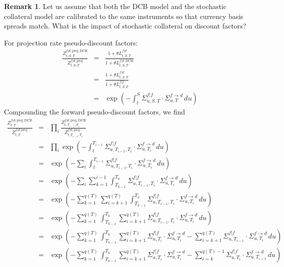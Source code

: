 \documentclass[11pt,english]{amsart}
\newcommand{\DCB}{\mathrm{DCB}}
\theoremstyle{definition}
\newtheorem{rema}{Remark}
\begin{document}
\begin{rema}
Let us assume that both the DCB model and the stochastic collateral model are calibrated to the same instruments so that currency basis spreads match. What is the impact of stochastic collateral on discount factors? 

For projection rate pseudo-discount factors:
\begin{eqnarray*}
  \frac{Z^{f|d,\mathrm{proj},\DCB}_{t,S,T}}{Z^{f|d,\mathrm{proj}}_{t,S,T}} 
  &=& \frac{1+\theta L^{f|d}_{t,S,T}}{1+\theta L^{f|d,\DCB}_{t,S,T}} \\
  &=& \frac{1+\theta L^{f|d}_{t,S,T}}{1+\theta L^{f|f}_{t,S,T}} \\
  &=& \exp\left( -\int_t^S \Sigma^{f|f}_{u,S,T} \cdot \Sigma^{f\to d}_{u,T}\, du \right) 
\end{eqnarray*} 
Compounding the forward pseudo-discount factors, we find
\begin{eqnarray*}
  \frac{Z^{f|d,\mathrm{proj},\DCB}_{t,T}}{Z^{f|d,\mathrm{proj}}_{t,T}} 
  &=& \prod_i \frac{Z^{f|d,\mathrm{proj},\DCB}_{t,T_{i-1},T_i}}{Z^{f|d,\mathrm{proj}}_{t,T_{i-1},T_i}}  \\
  &=& \prod_i  \exp\left( -\int_t^{T_{i-1}} \Sigma^{f|f}_{u,T_{i-1},T_i} \cdot \Sigma^{f\to d}_{u,T_i}\, du \right)   \\
  &=&  \exp\left( - \sum_i \int_t^{T_{i-1}} \Sigma^{f|f}_{u,T_{i-1},T_i} \cdot \Sigma^{f\to d}_{u,T_i}\, du \right)   \\
  &=&  \exp\left( - \sum_i \sum_{k=1}^{i-1} \int_{T_{k-1}}^{T_{k}} \Sigma^{f|f}_{u,T_{i-1},T_i} \cdot \Sigma^{f\to d}_{u,T_i}\, du \right)   \\
  &=&  \exp\left( - \sum_{k=1}^{q(T)} \sum_{i=k+1}^{q(T)}  \int_{T_{k-1}}^{T_{k}} \Sigma^{f|f}_{u,T_{i-1},T_i} \cdot \Sigma^{f\to d}_{u,T_i}\, du \right)   \\
  &=&  \exp\left( - \sum_{k=1}^{q(T)} \int_{T_{k-1}}^{T_{k}} \sum_{i=k+1}^{q(T)}  \Sigma^{f|f}_{u,T_{i-1},T_i} \cdot \Sigma^{f\to d}_{u,T_i}\, du \right)   \\
  &=&  \exp\left( - \sum_{k=1}^{q(T)} \int_{T_{k-1}}^{T_{k}} \sum_{i=k+1}^{q(T)}  \Sigma^{f|f}_{u,T_i} \cdot \Sigma^{f\to d}_{u,T_i} - \sum_{i=k+1}^{q(T)}  \Sigma^{f|f}_{u,T_{i-1}} \cdot \Sigma^{f\to d}_{u,T_i} \, du \right)   \\
  &=&  \exp\left( - \sum_{k=1}^{q(T)} \int_{T_{k-1}}^{T_{k}} \sum_{i=k+1}^{q(T)}  \Sigma^{f|f}_{u,T_i} \cdot \Sigma^{f\to d}_{u,T_i} - \sum_{i=k}^{q(T)-1}  \Sigma^{f|f}_{u,T_{i}} \cdot \Sigma^{f\to d}_{u,T_{i+1}} \, du \right)   \\

\end{eqnarray*}
\end{rema}
\end{document}
